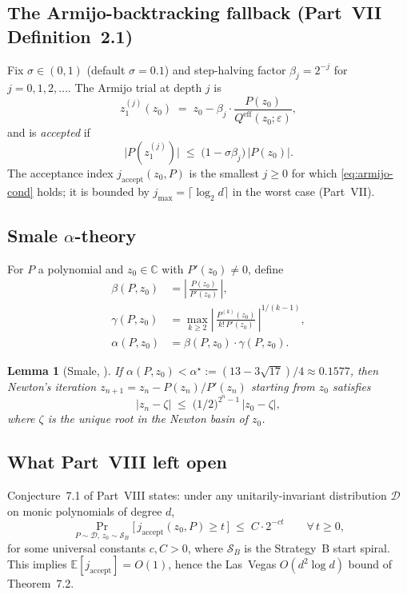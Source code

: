 \documentclass[11pt,a4paper]{article}
\newtheorem{lemma}[theorem]{Lemma}
\begin{document}
\subsection{The Armijo-backtracking fallback (Part~VII Definition~2.1)}
Fix $\sigma \in (0, 1)$ (default $\sigma = 0.1$) and step-halving factor $\beta_j = 2^{-j}$ for $j = 0, 1, 2, \dots$. The Armijo trial at depth $j$ is
\begin{equation}\label{eq:armijo-trial}
z_1^{(j)}(z_0) \;=\; z_0 - \beta_j \cdot \frac{P(z_0)}{Q^{\text{eff}}(z_0; \varepsilon)},
\end{equation}
and is \emph{accepted} if
\begin{equation}\label{eq:armijo-cond}
\bigl|P(z_1^{(j)})\bigr| \;\le\; \bigl(1 - \sigma \beta_j\bigr) \, \bigl|P(z_0)\bigr|.
\end{equation}
The acceptance index $j_{\text{accept}}(z_0, P)$ is the smallest $j \ge 0$ for which \eqref{eq:armijo-cond} holds; it is bounded by $j_{\max} = \lceil \log_2 d \rceil$ in the worst case (Part~VII).

\subsection{Smale $\alpha$-theory}
For $P$ a polynomial and $z_0 \in \mathbb{C}$ with $P'(z_0) \ne 0$, define
\begin{align}
\beta(P, z_0) &= \left|\,\frac{P(z_0)}{P'(z_0)}\,\right|, \\
\gamma(P, z_0) &= \max_{k \ge 2} \left|\,\frac{P^{(k)}(z_0)}{k!\, P'(z_0)}\,\right|^{1/(k - 1)}, \\
\alpha(P, z_0) &= \beta(P, z_0) \cdot \gamma(P, z_0).
\end{align}

\begin{lemma}[Smale, \cite{smale1986}]\label{lem:smale-alpha}
If $\alpha(P, z_0) < \alpha^\star := (13 - 3\sqrt{17}) / 4 \approx 0.1577$, then Newton's iteration $z_{n+1} = z_n - P(z_n)/P'(z_n)$ starting from $z_0$ satisfies
$$ |z_n - \zeta| \;\le\; \bigl(1/2\bigr)^{2^n - 1} \, |z_0 - \zeta|, $$
where $\zeta$ is the unique root in the Newton basin of $z_0$.
\end{lemma}

\subsection{What Part~VIII left open}
Conjecture~7.1 of Part~VIII states: under any unitarily-invariant distribution $\mathcal{D}$ on monic polynomials of degree $d$,
\begin{equation}\label{eq:conj7.1}
\Pr_{P \sim \mathcal{D},\, z_0 \sim \mathcal{S}_B}\!\bigl[\,j_{\text{accept}}(z_0, P) \ge t\,\bigr] \;\le\; C \cdot 2^{-c t} \qquad \forall\, t \ge 0,
\end{equation}
for some universal constants $c, C > 0$, where $\mathcal{S}_B$ is the Strategy~B start spiral. This implies $\mathbb{E}[j_{\text{accept}}] = O(1)$, hence the Las~Vegas $O(d^2 \log d)$ bound of Theorem~7.2.
\end{document}
